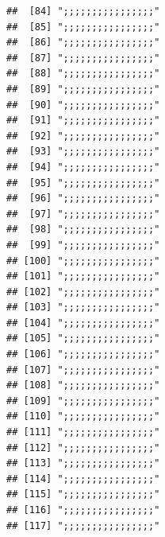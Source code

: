 \documentclass[
]{article}
\begin{document}
\begin{verbatim}
##  [84] ";;;;;;;;;;;;;;;;"                                                                    
##  [85] ";;;;;;;;;;;;;;;;"                                                                    
##  [86] ";;;;;;;;;;;;;;;;"                                                                    
##  [87] ";;;;;;;;;;;;;;;;"                                                                    
##  [88] ";;;;;;;;;;;;;;;;"                                                                    
##  [89] ";;;;;;;;;;;;;;;;"                                                                    
##  [90] ";;;;;;;;;;;;;;;;"                                                                    
##  [91] ";;;;;;;;;;;;;;;;"                                                                    
##  [92] ";;;;;;;;;;;;;;;;"                                                                    
##  [93] ";;;;;;;;;;;;;;;;"                                                                    
##  [94] ";;;;;;;;;;;;;;;;"                                                                    
##  [95] ";;;;;;;;;;;;;;;;"                                                                    
##  [96] ";;;;;;;;;;;;;;;;"                                                                    
##  [97] ";;;;;;;;;;;;;;;;"                                                                    
##  [98] ";;;;;;;;;;;;;;;;"                                                                    
##  [99] ";;;;;;;;;;;;;;;;"                                                                    
## [100] ";;;;;;;;;;;;;;;;"                                                                    
## [101] ";;;;;;;;;;;;;;;;"                                                                    
## [102] ";;;;;;;;;;;;;;;;"                                                                    
## [103] ";;;;;;;;;;;;;;;;"                                                                    
## [104] ";;;;;;;;;;;;;;;;"                                                                    
## [105] ";;;;;;;;;;;;;;;;"                                                                    
## [106] ";;;;;;;;;;;;;;;;"                                                                    
## [107] ";;;;;;;;;;;;;;;;"                                                                    
## [108] ";;;;;;;;;;;;;;;;"                                                                    
## [109] ";;;;;;;;;;;;;;;;"                                                                    
## [110] ";;;;;;;;;;;;;;;;"                                                                    
## [111] ";;;;;;;;;;;;;;;;"                                                                    
## [112] ";;;;;;;;;;;;;;;;"                                                                    
## [113] ";;;;;;;;;;;;;;;;"                                                                    
## [114] ";;;;;;;;;;;;;;;;"                                                                    
## [115] ";;;;;;;;;;;;;;;;"                                                                    
## [116] ";;;;;;;;;;;;;;;;"                                                                    
## [117] ";;;;;;;;;;;;;;;;"
\end{verbatim}
\end{document}
